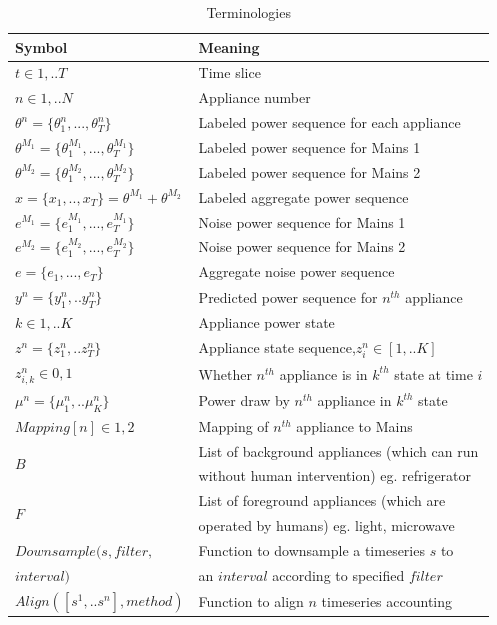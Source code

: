 \documentclass[conference]{IEEEtran}
\begin{document}
\begin{table}
\caption{Terminologies}
\label{tab:terms}
\begin{tabular}{|l|l|}
\hline
Symbol&Meaning\\
\hline
$t\in {1,..T}$& Time slice\\
$n\in{1,..N}$ & Appliance number\\
$\theta^n=\{\theta_1^n,...,\theta_T^n\}$ & Labeled power sequence for each appliance\\
$\theta^{M_1}=\{\theta_1^{M_1},...,\theta_T^{M_1}\}$ & Labeled power sequence for Mains 1\\
$\theta^{M_2}=\{\theta_1^{M_2},...,\theta_T^{M_2}\}$ & Labeled power sequence for Mains 2\\
$x=\{ x_1,..,x_T\}=\theta^{M_1}+\theta^{M_2}$ & Labeled aggregate power sequence\\
$e^{M_1}=\{e_1^{M_1},...,e_T^{M_1}\}$ & Noise power sequence for Mains 1\\
$e^{M_2}=\{e_1^{M_2},...,e_T^{M_2}\}$ & Noise power sequence for Mains 2\\
$e=\{e_1,...,e_T\}$ & Aggregate noise power sequence\\
$y^n=\{y_1^n,..y_T^n\}$ & Predicted power sequence for $n^{th}$ appliance\\
$k\in {1,..K}$ & Appliance power state\\
$z^n=\{z_1^n,..z_T^n\}$ & Appliance state sequence,$z_i^n \in [1,..K]$\\
$z_{i,k}^n \in{0,1}$ & Whether $n^{th}$ appliance is in $k^{th}$ state at time $i$\\
$\mu^n=\{\mu_1^n,..\mu_K^n\}$ & Power draw by $n^{th}$ appliance in $k^{th}$ state\\
$Mapping[n] \in {1,2}$ & Mapping of $n^{th}$ appliance to Mains\\
\hline
\multirow{2}{*}{$B$} & List of background appliances (which can run\\
 					 &without human intervention) eg. refrigerator\\
\multirow{2}{*}{$F$} & List of foreground appliances (which are \\ 
 					 &operated by humans) eg. light, microwave\\
\hline
$Downsample(s,filter,$ & Function to downsample a timeseries $s$ to\\
$interval)$                                        & an $interval$ according to specified $filter$\\
\multirow{2}{*}{$Align([s^1,..s^n],method)$} & Function to align $n$ timeseries accounting\\

\end{tabular}
\end{table}
\end{document}
